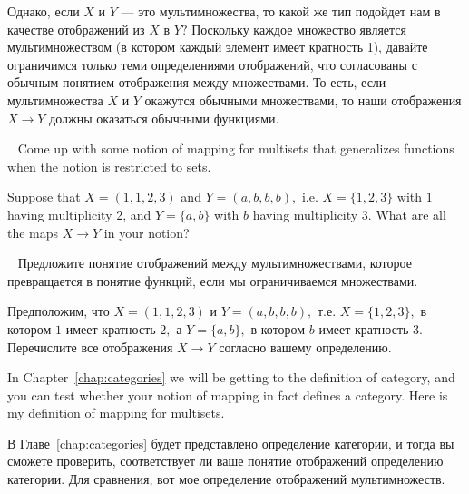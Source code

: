 \documentclass[../main/CT4S-EN-RU]{subfiles}
\begin{document}
\begin{blockRUS}
Однако, если $X$ и $Y$ — это мультимножества, то какой же тип подойдет нам в качестве отображений из $X$ в $Y?$ Поскольку каждое множество является мультимножеством (в котором каждый элемент имеет кратность 1), давайте ограничимся только теми определениями отображений, что согласованы с обычным понятием отображения между множествами. То есть, если мультимножества $X$ и $Y$ окажутся обычными множествами, то наши отображения $X{→} Y$ должны оказаться обычными функциями. 
\end{blockRUS}

\begin{exerciseENG}\label{exc:multiset 1}~
\sexc Come up with some notion of mapping for multisets that generalizes functions when the notion is restricted to sets. 
\item Suppose that $X=(1,1,2,3)$ and $Y=(a,b,b,b),$ i.e. $X=\{1,2,3\}$ with $1$ having multiplicity 2, and $Y=\{a,b\}$ with $b$ having multiplicity 3. What are all the maps $X{→} Y$ in your notion?
\endsexc
\end{exerciseENG}

\begin{exerciseRUS}\label{exc:multiset 1}~
\sexc Предложите понятие отображений между мультимножествами, которое превращается в понятие функций, если мы ограничиваемся множествами. 
\item Предположим, что $X=(1,1,2,3)$ и $Y=(a,b,b,b),$ т.е. $X=\{1,2,3\},$ в котором $1$ имеет кратность $2,$ а $Y=\{a,b\},$ в котором $b$ имеет кратность $3.$ Перечислите все отображения $X{→} Y$ согласно вашему определению.
\endsexc
\end{exerciseRUS}

\begin{blockENG}
In Chapter~\ref{chap:categories} we will be getting to the definition of category, and you can test whether your notion of mapping in fact defines a category. Here is my definition of mapping for multisets.
\end{blockENG}

\begin{blockRUS}
В Главе~\ref{chap:categories} будет представлено определение категории, и тогда вы сможете проверить, соответствует ли ваше понятие отображений определению категории. Для сравнения, вот мое определение отображений мультимножеств.
\end{blockRUS}
\end{document}
